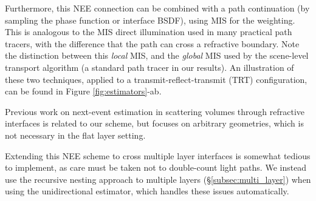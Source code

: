 Furthermore, this NEE connection can be combined with a path continuation (by sampling the phase function or interface BSDF), using MIS for the weighting. This is analogous to the MIS direct illumination used in many practical path tracers, with the difference that the path can cross a refractive boundary. Note the distinction between this \emph{local} MIS, and the \emph{global} MIS used by the scene-level transport algorithm (a standard path tracer in our results). An illustration of these two techniques, applied to a transmit-reflect-transmit (TRT) configuration, can be found in Figure \ref{fig:estimators}-ab.

Previous work on next-event estimation in scattering volumes through refractive interfaces \cite{Walter2009,Koerner2016} is related to our scheme, but focuses on arbitrary geometries, which is not necessary in the flat layer setting.

Extending this NEE scheme to cross multiple layer interfaces is somewhat tedious to implement, as care must be taken not to double-count light paths. We instead use the recursive nesting approach to multiple layers (\S\ref{subsec:multi_layer}) when using the unidirectional estimator, which handles these issues automatically.







